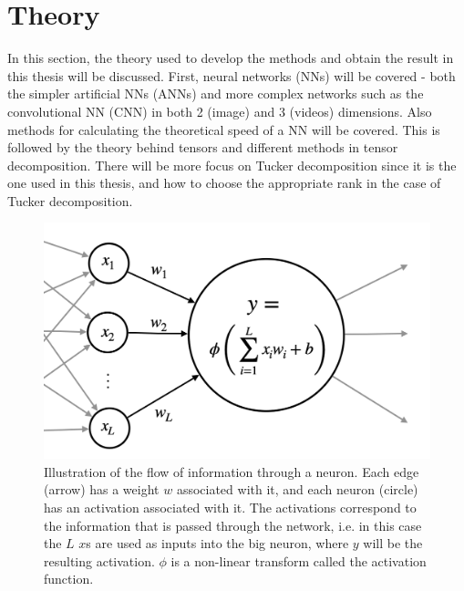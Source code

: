 \section{Theory} \label{tex:theory}
In this section, the theory used to develop the methods and obtain the result in this thesis will be discussed. First, neural networks (NNs) will be covered - both the simpler artificial NNs (ANNs) and more complex networks such as the convolutional NN (CNN) in both 2 (image) and 3 (videos) dimensions. Also methods for calculating the theoretical speed of a NN will be covered. This is followed by the theory behind tensors and different methods in tensor decomposition. There will be more focus on Tucker decomposition since it is the one used in this thesis, and how to choose the appropriate rank in the case of Tucker decomposition.
\begin{figure}[H]
    \centering
    \captionsetup{width=.95\linewidth}
    \includegraphics[width=.7\linewidth]{Pics/02_Theory/activation_illustration.png}
    \caption{Illustration of the flow of information through a neuron. Each edge (arrow) has a weight $w$ associated with it, and each neuron (circle) has an activation associated with it. The activations correspond to the information that is passed through the network, i.e. in this case the $L$ $x$s are used as inputs into the big neuron, where $y$ will be the resulting activation. $\phi$ is a non-linear transform called the activation function.}
    \label{fig:activation_illustration}
\end{figure}


